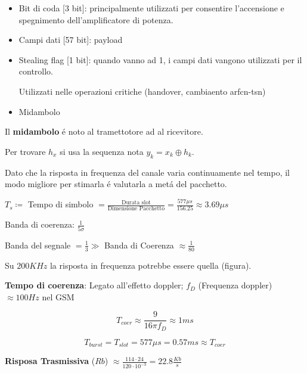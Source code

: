 \documentclass{article}
\begin{document}
\begin{itemize}
    \item Bit di coda [3 bit]: principalmente utilizzati per consentire l'accensione e spegnimento dell'amplificatore di potenza.
    \item Campi dati [57 bit]: payload
    \item Stealing flag [1 bit]: quando vanno ad 1, i campi dati vangono utilizzati per il controllo.

        Utilizzati nelle operazioni critiche (handover, cambiaento arfcn-tsn)
    \item Midambolo
\end{itemize}

Il \textbf{midambolo} \'e noto al tramettotore ad al ricevitore.

\begin{center}
\end{center}

Per trovare $h_x$ si usa la sequenza nota $y_k = x_k \oplus h_k$.

Dato che la risposta in frequenza del canale varia continuamente nel tempo, il modo migliore per stimarla \'e valutarla a met\'a del pacchetto.

$T_s \coloneqq$ Tempo di simbolo $ = \frac{\text{Durata slot}}{\text{Dimensione Pacchetto}} = \frac{577 \mu s}{156.25} \approx 3.69\mu s$

Banda di coerenza: $\frac{1}{5\sigma}$

Banda del segnale $=\frac{1}{3} \gg$ Banda di Coerenza $\approx \frac{1}{80}$

Su $200KHz$ la risposta in frequenza potrebbe essere quella (figura).

\textbf{Tempo di coerenza}: Legato all'effetto doppler; $f_D$ (Frequenza doppler) $\approx 100Hz$ nel GSM

\[ T_{coer} \approx \frac{9}{16\pi f_D} \approx 1ms \]

\[T_{burst} = T_{slot} = 577 \mu s = 0.57 ms \approx T_{coer}\]

\textbf{Risposa Trasmissiva} ($Rb$) $\approx \frac{114\cdot24}{120\cdot10^{-3}} = 22.8\frac{Kb}{s}$
\end{document}

